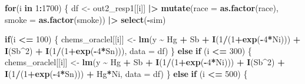 \documentclass[12pt, twoside]{amherstthesis}
\newenvironment{Shaded}{\begin{snugshade}}{\end{snugshade}}
\newcommand{\AttributeTok}[1]{\textcolor[rgb]{0.13,0.29,0.53}{#1}}
\newcommand{\ControlFlowTok}[1]{\textcolor[rgb]{0.13,0.29,0.53}{\textbf{#1}}}
\newcommand{\DecValTok}[1]{\textcolor[rgb]{0.00,0.00,0.81}{#1}}
\newcommand{\FunctionTok}[1]{\textcolor[rgb]{0.13,0.29,0.53}{\textbf{#1}}}
\newcommand{\NormalTok}[1]{#1}
\newcommand{\OtherTok}[1]{\textcolor[rgb]{0.56,0.35,0.01}{#1}}
\newcommand{\SpecialCharTok}[1]{\textcolor[rgb]{0.81,0.36,0.00}{\textbf{#1}}}
\begin{document}
\begin{Shaded}
\begin{Highlighting}[]
  \ControlFlowTok{for}\NormalTok{(i }\ControlFlowTok{in} \DecValTok{1}\SpecialCharTok{:}\DecValTok{1700}\NormalTok{) \{}
\NormalTok{    df }\OtherTok{\textless{}{-}}\NormalTok{ out2\_resp1[[i]] }\SpecialCharTok{|\textgreater{}} 
      \FunctionTok{mutate}\NormalTok{(}\AttributeTok{race =} \FunctionTok{as.factor}\NormalTok{(race), }\AttributeTok{smoke =} \FunctionTok{as.factor}\NormalTok{(smoke)) }\SpecialCharTok{|\textgreater{}} 
      \FunctionTok{select}\NormalTok{(}\SpecialCharTok{{-}}\NormalTok{sim)}
    
    \ControlFlowTok{if}\NormalTok{(i }\SpecialCharTok{\textless{}=} \DecValTok{100}\NormalTok{) \{}
\NormalTok{      chems\_oraclel[[i]] }\OtherTok{\textless{}{-}} \FunctionTok{lm}\NormalTok{(y }\SpecialCharTok{\textasciitilde{}}\NormalTok{ Hg }\SpecialCharTok{+}\NormalTok{ Sb }\SpecialCharTok{+}
                                \FunctionTok{I}\NormalTok{(}\DecValTok{1}\SpecialCharTok{/}\NormalTok{(}\DecValTok{1}\SpecialCharTok{+}\FunctionTok{exp}\NormalTok{(}\SpecialCharTok{{-}}\DecValTok{4}\SpecialCharTok{*}\NormalTok{Ni))) }\SpecialCharTok{+} \FunctionTok{I}\NormalTok{(Sb}\SpecialCharTok{\^{}}\DecValTok{2}\NormalTok{) }\SpecialCharTok{+} 
                                \FunctionTok{I}\NormalTok{(}\DecValTok{1}\SpecialCharTok{/}\NormalTok{(}\DecValTok{1}\SpecialCharTok{+}\FunctionTok{exp}\NormalTok{(}\SpecialCharTok{{-}}\DecValTok{4}\SpecialCharTok{*}\NormalTok{Sn))), }\AttributeTok{data =}\NormalTok{ df)}
\NormalTok{    \} }\ControlFlowTok{else} \ControlFlowTok{if}\NormalTok{ (i }\SpecialCharTok{\textless{}=} \DecValTok{300}\NormalTok{) \{}
\NormalTok{      chems\_oraclel[[i]] }\OtherTok{\textless{}{-}} \FunctionTok{lm}\NormalTok{(y }\SpecialCharTok{\textasciitilde{}}\NormalTok{ Hg }\SpecialCharTok{+}\NormalTok{ Sb }\SpecialCharTok{+}
                                \FunctionTok{I}\NormalTok{(}\DecValTok{1}\SpecialCharTok{/}\NormalTok{(}\DecValTok{1}\SpecialCharTok{+}\FunctionTok{exp}\NormalTok{(}\SpecialCharTok{{-}}\DecValTok{4}\SpecialCharTok{*}\NormalTok{Ni))) }\SpecialCharTok{+} \FunctionTok{I}\NormalTok{(Sb}\SpecialCharTok{\^{}}\DecValTok{2}\NormalTok{) }\SpecialCharTok{+} \FunctionTok{I}\NormalTok{(}\DecValTok{1}\SpecialCharTok{/}\NormalTok{(}\DecValTok{1}\SpecialCharTok{+}\FunctionTok{exp}\NormalTok{(}\SpecialCharTok{{-}}\DecValTok{4}\SpecialCharTok{*}\NormalTok{Sn))) }\SpecialCharTok{+}
\NormalTok{                                Hg}\SpecialCharTok{*}\NormalTok{Ni, }\AttributeTok{data =}\NormalTok{ df)}
\NormalTok{    \} }\ControlFlowTok{else} \ControlFlowTok{if}\NormalTok{ (i }\SpecialCharTok{\textless{}=} \DecValTok{500}\NormalTok{) \{}

\end{Highlighting}
\end{Shaded}
\end{document}

